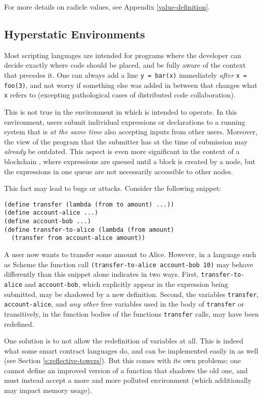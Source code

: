 For more details on radicle values, see Appendix \ref{value-definition}.

\subsection{Hyperstatic Environments}
\label{s:hyperstatic}

Most scripting languages are intended for programs where the developer can
decide exactly where code should be placed, and be fully aware of the context
that precedes it. One can always add a line \texttt{y = bar(x)} immediately
\emph{after} \texttt{x = foo(3)}, and not worry if something else was
added in between that changes what \texttt{x} refers to (excepting pathological
cases of distributed code collaboration).

This is not true in the environment in which \rad{} is intended to operate. In this
environment, users submit individual expressions or declarations to a running
system that is \emph{at the same time} also accepting inputs from other users.
Moreover, the view of the program that the submitter has at the time of
submission may \emph{already} be outdated. This aspect is even more significant
in the context of a blockchain \cite{Nakamoto2008}, where expressions are
queued until a block is created by a node, but the expressions in one queue are not
necessarily accessible to other nodes.

This fact may lead to bugs or attacks. Consider the following snippet:
\begin{lstlisting}
(define transfer (lambda (from to amount) ...))
(define account-alice ...)
(define account-bob ...)
(define transfer-to-alice (lambda (from amount)
  (transfer from account-alice amount))
\end{lstlisting}
A user now wants to transfer some amount to Alice. However, in a language such
as Scheme the function call \texttt{(transfer-to-alice account-bob 10)} may
behave differently than this snippet alone indicates in two ways. First,
\texttt{transfer-to-alice} and \texttt{account-bob}, which explicitly appear in
the expression being submitted, may be shadowed by a new definition. Second, the
variables \texttt{transfer}, \texttt{account-alice}, and \emph{any other} free
variables used in the body of \texttt{transfer} or transitively, in the function
bodies of the functions \texttt{transfer} calls, may have been redefined.

One solution is to not allow the redefinition of variables at all. This is
indeed what some smart contract \cite{Szabo94} languages do, and can be implemented easily in
\rad{} as well (see Section \ref{s:reflective-towers}). But this comes with its
own problems; one cannot define an improved version of a function that shadows
the old one, and must instead accept a more and more polluted environment (which
additionally may impact memory usage).

